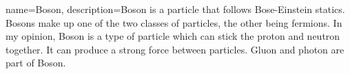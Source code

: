 {
    name=Boson,
    description={Boson is a particle that follows Bose-Einstein statics. Bosons make up one of the two classes of particles, the other being fermions. In my opinion, Boson is a type of particle which can stick the proton and neutron together. It can produce a strong force between particles. Gluon and photon are part of Boson.}
}
